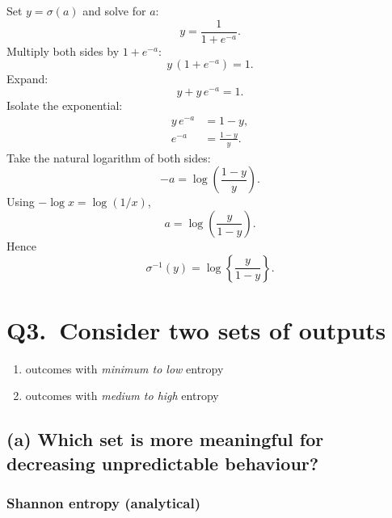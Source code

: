 \documentclass[12pt,a4paper]{article}
\begin{document}
Set \(y=\sigma(a)\) and solve for \(a\):
\begin{equation}
  y=\frac{1}{1+e^{-a}}.
\end{equation}
Multiply both sides by \(1+e^{-a}\):
\begin{equation}
  y\,(1+e^{-a})=1.
\end{equation}
Expand:
\begin{equation}
  y+y\,e^{-a}=1.
\end{equation}
Isolate the exponential:
\begin{align}
  y\,e^{-a}&=1-y,\\
  e^{-a}&=\frac{1-y}{y}.
\end{align}
Take the natural logarithm of both sides:
\begin{equation}
  -a=\log\!\left(\frac{1-y}{y}\right).
\end{equation}
Using \(-\log x=\log(1/x)\),
\begin{equation}
  a=\log\!\left(\frac{y}{1-y}\right).
\end{equation}
Hence
\begin{equation}
  \sigma^{-1}(y)=\log\!\left\{\frac{y}{1-y}\right\}.
\end{equation}

\clearpage
\section*{Q3.\ Consider two sets of outputs}

\begin{enumerate}
  \item[\textbf{Set~A:}] outcomes with \emph{minimum to low} entropy
  \item[\textbf{Set~B:}] outcomes with \emph{medium to high} entropy
\end{enumerate}

\subsection*{(a) Which set is more meaningful for decreasing unpredictable behaviour?}

\subsubsection*{Shannon entropy (analytical)}
\end{document}
